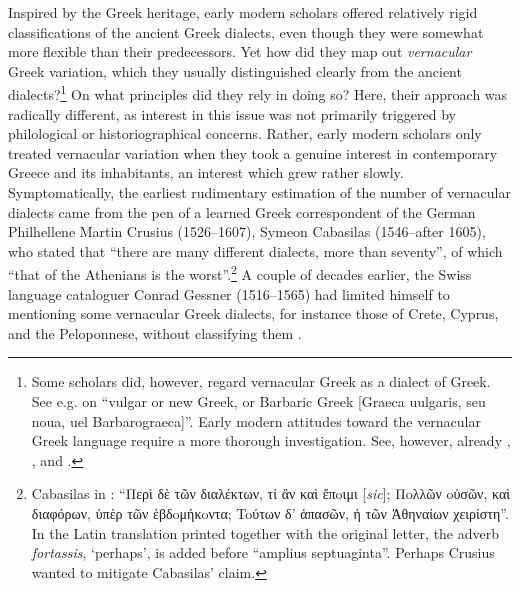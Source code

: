 {Inspired by the Greek heritage, early modern scholars offered relatively rigid classifications of the ancient Greek dialects, even though they were somewhat more flexible than their predecessors. Yet how did they map out \textit{vernacular} Greek variation, which they usually distinguished clearly from the ancient dialects?\footnote{Some scholars did, however, regard vernacular Greek as a dialect of Greek. See e.g. \citet[.7\textsc{\textsuperscript{v}}]{Megiser1603} on “vulgar or new Greek, or Barbaric Greek [Graeca uulgaris, seu noua, uel Barbarograeca]”. Early modern attitudes toward the vernacular Greek language require a more thorough investigation. See, however, already \citet{Caratzas1952}, \citet{Rotolo1973}, and \citet{Toufexis2005}.} On what principles did they rely in doing so? Here, their approach was radically different, as interest in this issue was not primarily triggered by philological or historiographical concerns. Rather, early modern scholars only treated vernacular variation when they took a genuine interest in contemporary Greece and its inhabitants, an interest which grew rather slowly. Symptomatically, the earliest rudimentary estimation of the number of vernacular dialects came from the pen of a learned Greek correspondent of the German Philhellene Martin Crusius (1526–1607), Symeon Cabasilas (1546–after 1605), who stated that “there are many different dialects, more than seventy”, of which “that of the Athenians is the worst”.\footnote{Cabasilas in \citet[461]{Crusius1584}: “Περὶ δὲ τῶν διαλέκτων, τί ἂν καὶ ἔπoιμι [\textit{sic}]; Πoλλῶν oὐσῶν, καὶ διαφόρων, ὑπὲρ τῶν ἑβδoμήκoντα; Toύτων δ' ἁπασῶν, ἡ τῶν Ἀθηναίων χειρίστη”. In the Latin translation printed together with the original letter, the adverb \textit{fortassis}, ‘perhaps’, is added before “amplius septuaginta”. Perhaps Crusius wanted to mitigate Cabasilas’ claim.} A couple of decades earlier, the Swiss language cataloguer Conrad Gessner (1516–1565) had limited himself to mentioning some vernacular Greek dialects, for instance those of Crete, Cyprus, and the Peloponnese, without classifying them \citep[47\textsc{\textsuperscript{r}}]{Gessner1555}.

}
